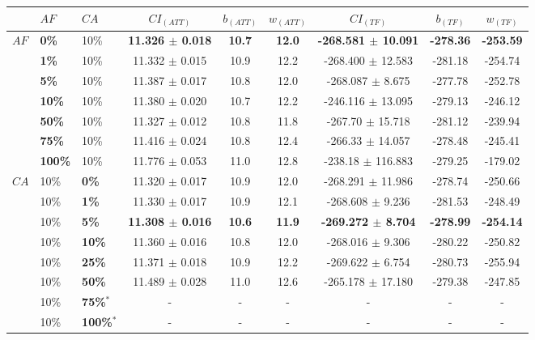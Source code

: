 \begin{sidewaystable}
    \begin{tabular}{|l|l|l||c|c|c|c|c|c|}
    \hline
    ~ & $AF$ & $CA$ & $CI_{(ATT)}$ & $b_{(ATT)}$ & $w_{(ATT)}$ & $CI_{(TF)}$ & $b_{(TF)}$ & $w_{(TF)}$ \\
    \hline
    $AF$ & \textbf{0\%} & 10\% & \textbf{11.326 $\pm$ 0.018} & \textbf{10.7} & \textbf{12.0} & \textbf{-268.581 $\pm$ 10.091} & \textbf{-278.36} & \textbf{-253.59} \\
    ~ & \textbf{1\%} & 10\% & 11.332 $\pm$ 0.015 & 10.9 & 12.2 & -268.400 $\pm$ 12.583  & -281.18 & -254.74 \\
    ~ & \textbf{5\%} & 10\% & 11.387 $\pm$ 0.017 & 10.8 & 12.0 & -268.087 $\pm$ 8.675 & -277.78 & -252.78 \\ 
    ~ & \textbf{10\%} & 10\% & 11.380 $\pm$ 0.020 & 10.7 & 12.2 & -246.116 $\pm$ 13.095 & -279.13 & -246.12 \\ 
    ~ & \textbf{50\%} & 10\% & 11.327 $\pm$ 0.012 & 10.8 & 11.8 & -267.70 $\pm$ 15.718 & -281.12& -239.94 \\ 
    ~ & \textbf{75\%} & 10\% & 11.416 $\pm$ 0.024 & 10.8 & 12.4 & -266.33 $\pm$ 14.057 & -278.48 & -245.41 \\ 
    ~ & \textbf{100\%} & 10\% & 11.776 $\pm$ 0.053 & 11.0 & 12.8 & -238.18 $\pm$ 116.883 & -279.25 & -179.02 \\ 
    \hline
    $CA$ & 10\% &\textbf{0\%} & 11.320 $\pm$ 0.017 & 10.9 & 12.0 & -268.291 $\pm$ 11.986 & -278.74 & -250.66 \\
    ~ & 10\% &\textbf{1\%} & 11.330 $\pm$ 0.017 & 10.9 & 12.1 & -268.608 $\pm$ 9.236 & -281.53 & -248.49 \\
    ~ & 10\% &\textbf{5\%} & \textbf{11.308 $\pm$ 0.016} & \textbf{10.6} & \textbf{11.9} & \textbf{-269.272 $\pm$ 8.704} & \textbf{-278.99} & \textbf{-254.14} \\
    ~ & 10\% &\textbf{10\%} & 11.360 $\pm$ 0.016 & 10.8 & 12.0 & -268.016 $\pm$ 9.306 & -280.22 & -250.82 \\
    ~ & 10\% &\textbf{25\%} & 11.371 $\pm$ 0.018 & 10.9 & 12.2 & -269.622 $\pm$ 6.754 & -280.73 & -255.94 \\
    ~ & 10\% &\textbf{50\%} & 11.489 $\pm$ 0.028 & 11.0 & 12.6 & -265.178 $\pm$ 17.180 & -279.38 & -247.85 \\
    ~ & 10\% &\textbf{75\%$^*$} & - & - & - & - & - & - \\
    ~ & 10\% &\textbf{100\%$^*$} & - & - & - & - & - & - \\

\end{tabular}
\end{sidewaystable}
